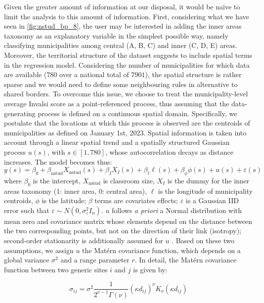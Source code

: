 \documentclass[openany]{book}
\begin{document}
Given the greater amount of information at our disposal, it would be na{\"i}ve to limit the analysis to this amount of information. First, considering what we have seen in \ref{fig:nstud_bp_8}, the user may be interested in adding the inner areas taxonomy as an explanatory variable in the simplest possible way, namely classifying municipalities among central (A, B, C) and inner (C, D, E) areas. Moreover, the territorial structure of the dataset suggests to include spatial terms in the regression model. Considering the number of municipalities for which data are available ($780$ over a national total of $7901$), the spatial structure is rather sparse and we would need to define some neighbouring rules in alternative to shared borders. To overcome this issue, we choose to treat the municipality-level average Invalsi score as a point-referenced process, thus assuming that the data-generating process is defined on a continuous spatial domain. Specifically, we postulate that the locations at which this process is observed are the centroids of municipalities as defined on January 1st, 2023.
Spatial information is taken into account through a linear spatial trend and a spatially structured Gaussian process $u(s)$, with $s \in [1, 780]$, whose autocorrelation decays as distance increases. The model becomes thus:
%
\begin{equation}
y(s) = \beta_0 + \beta_\mathrm{nstud} X_\mathrm{nstud}(s) + \beta_{I} X_{I}(s) + \beta_{\ell} \ell(s) +\beta_{\phi} \phi(s) + u(s) + \varepsilon(s)
\label{eq:spde}
\end{equation}
%
where $\beta_0$ is the intercept, $X_\mathrm{nstud}$ is classroom size, $X_I$ is the dummy for the inner areas taxonomy ($1$: inner area, $0$: central area), $\ell$ is the longitude of municipality centroids, $\phi$ is the latitude; $\beta$ terms are covariates effects; $\varepsilon$ is a Gaussian IID error such that $\varepsilon \sim N  (0, \sigma_{\varepsilon}^2 I_n)$. $u$ follows \textit{a priori} a Normal distribution with mean zero and covariance matrix whose elements depend on the distance between the two corresponding points, but not on the direction of their link (isotropy); second-order stationarity is additionally assumed for $u$ \citep[][ Section 2.1]{Banerjee}. Based on these two assumptions, we assign $u$ the Matérn covariance function, which depends on a global variance $\sigma^2$ and a range parameter $r$. In detail, the Matérn covariance function between two generic sites $i$ and $j$ is given by:

%
\begin{equation}
\sigma_{ij} =\sigma^2 \frac{1}{2^{\nu-1}\Gamma(\nu)} \left(\kappa  d_{ij}\right)^{\nu}
K_{\nu}(\kappa d_{ij}) 
\label{eq:matern}
\end{equation}
%
\end{document}
